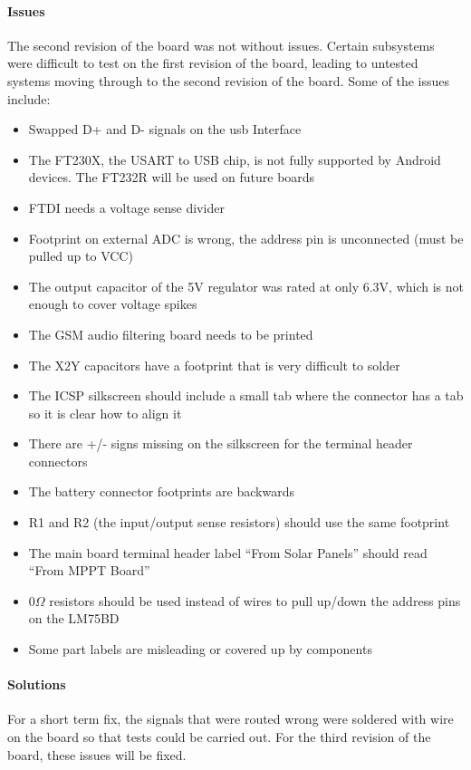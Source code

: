 \documentclass{article}
\numberwithin{figure}{section}
\numberwithin{equation}{section}
\begin{document}
{\paragraph{Issues}
The second revision of the board was not without issues. Certain subsystems were difficult to test on the first revision of the board, leading to untested systems moving through to the second revision of the board. Some of the issues include:
\begin{itemize}
\item Swapped D+ and D- signals on the usb Interface
\item The FT230X, the USART to USB chip, is not fully supported by Android devices. The FT232R will be used on future boards
\item FTDI needs a voltage sense divider
\item Footprint on external ADC is wrong, the address pin is unconnected (must be pulled up to VCC)
\item The output capacitor of the 5V regulator was rated at only 6.3V, which is not enough to cover voltage spikes
\item The GSM audio filtering board needs to be printed
\item The X2Y capacitors have a footprint that is very difficult to solder
\item The ICSP silkscreen should include a small tab where the connector has a tab so it is clear how to align it
\item There are +/- signs missing on the silkscreen for the terminal header connectors
\item The battery connector footprints are backwards
\item R1 and R2 (the input/output sense resistors) should use the same footprint
\item The main board terminal header label ``From Solar Panels'' should read ``From MPPT Board''
\item 0$\Omega$ resistors should be used instead of wires to pull up/down the address pins on the LM75BD
\item Some part labels are misleading or covered up by components
\end{itemize}
\paragraph{Solutions}
For a short term fix, the signals that were routed wrong were soldered with wire on the board so that tests could be carried out. For the third revision of the board, these issues will be fixed.
}
\end{document}
